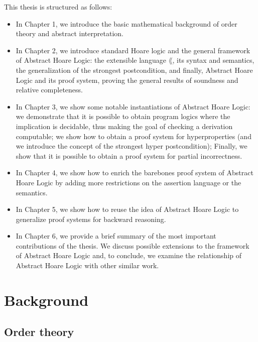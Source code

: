 \documentclass[
  10pt,       %
  twoside,    %
  a4paper,    %
  english,    %
  tikz,       %
  openright,  %
]{book}
\begin{document}
This thesis is structured as follows:
\begin{itemize}
  \item In Chapter 1, we introduce the basic mathematical background of order
    theory and abstract interpretation.

  \item In Chapter 2, we introduce standard Hoare logic and the general
    framework of Abstract Hoare Logic: the extensible language $\lang$, its
    syntax and semantics, the generalization of the strongest postcondition,
    and finally, Abstract Hoare Logic and its proof system, proving the general
    results of soundness and relative completeness.

  \item In Chapter 3, we show some notable instantiations of Abstract Hoare
    Logic: we demonstrate that it is possible to obtain program logics where
    the implication is decidable, thus making the goal of checking a derivation
    computable; we show how to obtain a proof system for hyperproperties (and
    we introduce the concept of the strongest hyper postcondition); Finally, we
    show that it is possible to obtain a proof system for partial
    incorrectness.

  \item In Chapter 4, we show how to enrich the barebones proof system of
    Abstract Hoare Logic by adding more restrictions on the assertion language
    or the semantics.

  \item In Chapter 5, we show how to reuse the idea of Abstract Hoare Logic to
    generalize proof systems for backward reasoning.

  \item In Chapter 6, we provide a brief summary of the most important
    contributions of the thesis. We discuss possible extensions to the
    framework of Abstract Hoare Logic and, to conclude, we examine the
    relationship of Abstract Hoare Logic with other similar work.
\end{itemize}

\chapter{Background}

\section{Order theory}\label{sec:backround:order_theory}
\end{document}
